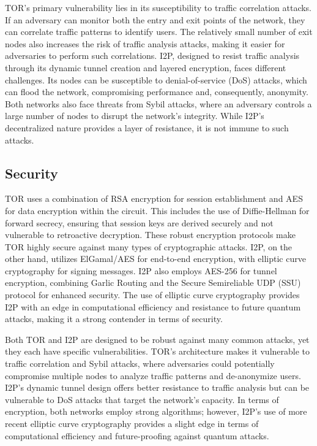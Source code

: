 \documentclass[12pt,conference]{IEEEtran}
\begin{document}
TOR’s primary vulnerability lies in its susceptibility to traffic correlation attacks. If an adversary can monitor both the entry and exit points of the network, they can correlate traffic patterns to identify users. The relatively small number of exit nodes also increases the risk of traffic analysis attacks, making it easier for adversaries to perform such correlations. I2P, designed to resist traffic analysis through its dynamic tunnel creation and layered encryption, faces different challenges. Its nodes can be susceptible to denial-of-service (DoS) attacks, which can flood the network, compromising performance and, consequently, anonymity. Both networks also face threats from Sybil attacks, where an adversary controls a large number of nodes to disrupt the network’s integrity. While I2P's decentralized nature provides a layer of resistance, it is not immune to such attacks.

\subsection{Security}
TOR uses a combination of RSA encryption for session establishment and AES for data encryption within the circuit. This includes the use of Diffie-Hellman for forward secrecy, ensuring that session keys are derived securely and not vulnerable to retroactive decryption. These robust encryption protocols make TOR highly secure against many types of cryptographic attacks. I2P, on the other hand, utilizes ElGamal/AES for end-to-end encryption, with elliptic curve cryptography for signing messages. I2P also employs AES-256 for tunnel encryption, combining Garlic Routing and the Secure Semireliable UDP (SSU) protocol for enhanced security. The use of elliptic curve cryptography provides I2P with an edge in computational efficiency and resistance to future quantum attacks, making it a strong contender in terms of security.

Both TOR and I2P are designed to be robust against many common attacks, yet they each have specific vulnerabilities. TOR’s architecture makes it vulnerable to traffic correlation and Sybil attacks, where adversaries could potentially compromise multiple nodes to analyze traffic patterns and de-anonymize users. I2P’s dynamic tunnel design offers better resistance to traffic analysis but can be vulnerable to DoS attacks that target the network’s capacity. In terms of encryption, both networks employ strong algorithms; however, I2P’s use of more recent elliptic curve cryptography provides a slight edge in terms of computational efficiency and future-proofing against quantum attacks.
\end{document}
